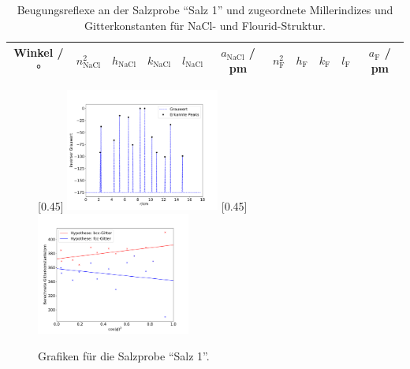 \begin{table}[H]
  \centering
  \caption{Beugungsreflexe an der Salzprobe \enquote{Salz 1} und zugeordnete Millerindizes und Gitterkonstanten
  für NaCl- und Flourid-Struktur.}
  \label{Tab:Salzb}
  \begin{tabular}{c || c c c c c|c c c c c}
    \toprule
    Winkel / ° &
    $n_{\text{NaCl}}^{2}$ &
    $h_{\text{NaCl}}$ &
    $k_{\text{NaCl}}$ &
    $l_{\text{NaCl}}$ &
    $a_{\text{NaCl}}$ / pm &
    $n_{\text{F}}^{2}$ &
    $h_{\text{F}}$ &
    $k_{\text{F}}$ &
    $l_{\text{F}}$ &
    $a_{\text{F}}$ / pm \\
    \midrule
    
    \bottomrule
  \end{tabular}
\end{table}

\begin{figure}[h!]
  \centering
  [0.45\textwidth]{
  \centering
  \includegraphics[width=0.45\textwidth]{Auswertung/Grafiken/Salt_Peaks.pdf}
  }
  [0.45\textwidth]{
  \centering
  \includegraphics[width=0.45\textwidth]{Auswertung/Grafiken/Salt_Ausgleichsrechnung.pdf}
  }\\
  \label{Abb:Salz_Plots}
  \caption{Grafiken für die Salzprobe \enquote{Salz 1}.}
\end{figure}

